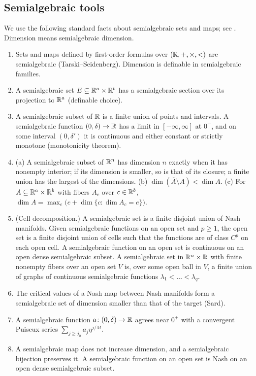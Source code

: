\subsection{Semialgebraic tools}\label{sec:semialgebraic}

We use the following standard facts about semialgebraic sets and maps; see \cite{BCR98,vdD98}. Dimension means semialgebraic dimension.

\begin{enumerate}[label=\textup{(S\arabic*)},ref=\textup{(S\arabic*)},leftmargin=3em]
\item\label{S1} Sets and maps defined by first-order formulas over $(\mathbb{R},+,\times,<)$ are semialgebraic (Tarski--Seidenberg). Dimension is definable in semialgebraic families.
\item\label{S2} A semialgebraic set $E\subseteq\mathbb{R}^a\times\mathbb{R}^b$ has a semialgebraic section over its projection to $\mathbb{R}^a$ (definable choice).
\item\label{S3} A semialgebraic subset of $\mathbb{R}$ is a finite union of points and intervals. A semialgebraic function $(0,\delta)\to\mathbb{R}$ has a limit in $[-\infty,\infty]$ at $0^+$, and on some interval $(0,\delta')$ it is continuous and either constant or strictly monotone (monotonicity theorem).
\item\label{S4} \textup{(a)} A semialgebraic subset of $\mathbb{R}^n$ has dimension $n$ exactly when it has nonempty interior; if its dimension is smaller, so is that of its closure; a finite union has the largest of the dimensions. \textup{(b)} $\dim(\overline A\setminus A)<\dim A$. \textup{(c)} For $A\subseteq\mathbb{R}^a\times\mathbb{R}^b$ with fibers $A_c$ over $c\in\mathbb{R}^b$, $\dim A=\max_e\bigl(e+\dim\{c:\dim A_c=e\}\bigr)$.
\item\label{S5} (Cell decomposition.) A semialgebraic set is a finite disjoint union of Nash manifolds. Given semialgebraic functions on an open set and $p\ge1$, the open set is a finite disjoint union of cells such that the functions are of class $C^p$ on each open cell. A semialgebraic function on an open set is continuous on an open dense semialgebraic subset. A semialgebraic set in $\mathbb{R}^n\times\mathbb{R}$ with finite nonempty fibers over an open set $V$ is, over some open ball in $V$, a finite union of graphs of continuous semialgebraic functions $\lambda_1<\dots<\lambda_q$.
\item\label{S6} The critical values of a Nash map between Nash manifolds form a semialgebraic set of dimension smaller than that of the target (Sard).
\item\label{S7} A semialgebraic function $a\colon(0,\delta)\to\mathbb{R}$ agrees near $0^+$ with a convergent Puiseux series $\sum_{j\ge j_0}a_j\eta^{j/M}$.
\item\label{S8} A semialgebraic map does not increase dimension, and a semialgebraic bijection preserves it. A semialgebraic function on an open set is Nash on an open dense semialgebraic subset.
\end{enumerate}

